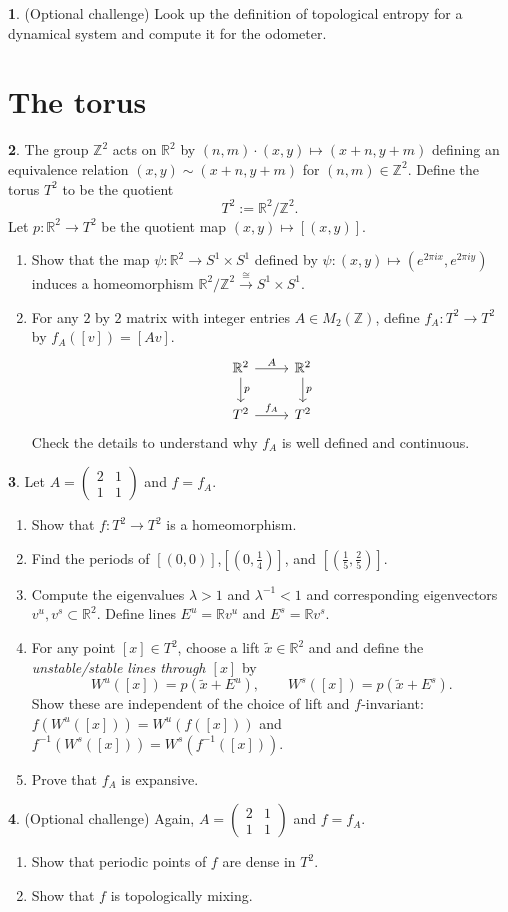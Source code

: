 \documentclass[11pt]{article}
\theoremstyle{definition}
\newtheorem{problem}{}
\newcommand{\bp}{\begin{problem}}
\newcommand{\ep}{\end{problem}\bigskip}
\theoremstyle{theorem}
\newcommand{\R}{\mathbb{R}}%
\newcommand{\Z}{\mathbb{Z}}%
\begin{document}
\bp (Optional challenge) Look up the definition of topological entropy for a dynamical system and compute it for the odometer.
\ep


\section*{The torus}

\bp The group $\Z^2$ acts on $\R^2$ by $(n,m)\cdot (x,y)\mapsto (x+n,y+m)$ defining an equivalence relation $(x,y)\sim(x+n,y+m)$ for $(n,m)\in \Z^2$.  Define the torus $T^2$ to be the quotient \[T^2:=\R^2/\Z^2.\]   Let $p:\R^2 \to T^2$ be the quotient map $(x,y)\mapsto [(x,y)].$  
\begin{enumerate}[label=(\alph*)]
\item Show that the map $\psi:\R^2 \to S^1\times S^1$ defined by $\psi:(x,y)\mapsto (e^{2\pi i x},e^{2\pi i y})$ induces a homeomorphism $\R^2/\Z^2 \xrightarrow{\;\cong\;} S^1\times S^1$.
\item For any $2$ by $2$ matrix with integer entries $A\in M_2(\Z)$, define $f_A:T^2\to T^2$ by $f_A([v])=[Av]$. 
\[
\begin{tikzcd}
\R^2 \arrow[r, "\scriptstyle A"] \arrow[d, "\scriptstyle p"] & \R^2 \arrow[d, "\scriptstyle p"] \\
T^2 \arrow[r, "\scriptstyle f_A"] & T^2
\end{tikzcd}
\]
 Check the details to understand why $f_A$ is well defined and continuous.
\end{enumerate}
\ep

\bp Let $A=\begin{pmatrix}2&1\\[2pt]1&1\end{pmatrix}$ and $f=f_A$.
\begin{enumerate}[label=(\alph*)]
\item Show that $f:T^2\to T^2$ is a homeomorphism.
\item Find the periods of $\left[\left(0,0\right)\right]$,$\left[\left(0,\frac{1}{4}\right)\right]$, and $\left[\left(\frac{1}{5},\frac{2}{5}\right)\right]$.
\item Compute the eigenvalues $\lambda>1$ and $\lambda^{-1}<1$ and corresponding eigenvectors $v^u,v^s\subset\R^2$.  Define lines $E^u=\R v^u$ and $E^s=\R v^s$.
\item For any point $[x]\in T^2$, choose a lift $\tilde{x}\in \R^2$ and and define the \emph{unstable/stable lines through $[x]$} by
\[
W^u([x])=p(\tilde x+E^u),\qquad W^s([x])=p(\tilde x+E^s).
\]
Show these are independent of the choice of lift and $f$-invariant:
$f(W^u([x]))=W^u(f([x]))$ and $f^{-1}(W^s([x]))=W^s(f^{-1}([x]))$.
\item Prove that $f_A$ is expansive.
\end{enumerate}
\ep

\bp (Optional challenge)  Again, $A=\begin{pmatrix}2&1\\[2pt]1&1\end{pmatrix}$ and $f=f_A$.
\begin{enumerate}[label=(\alph*)]
\item Show that periodic points of $f$ are dense in $T^2$.
\item Show that $f$ is topologically mixing.
\end{enumerate}
\ep
\end{document}
